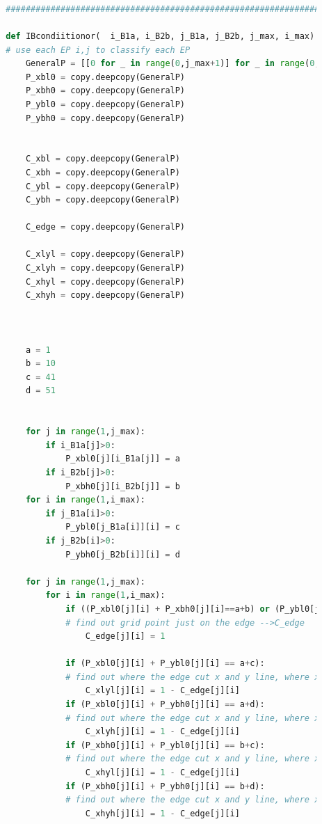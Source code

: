 \documentclass[12pt]{article}
\begin{document}
\begin{scriptsize}
\begin{lstlisting}[language=python,caption={Python code-Potential Flow}]
        
        
        
        ##########################################################################################
        
        def IBcondiitionor(  i_B1a, i_B2b, j_B1a, j_B2b, j_max, i_max): 
        # use each EP i,j to classify each EP
            GeneralP = [[0 for _ in range(0,j_max+1)] for _ in range(0,i_max+1)]
            P_xbl0 = copy.deepcopy(GeneralP)
            P_xbh0 = copy.deepcopy(GeneralP)
            P_ybl0 = copy.deepcopy(GeneralP)
            P_ybh0 = copy.deepcopy(GeneralP)
        
        
            C_xbl = copy.deepcopy(GeneralP)
            C_xbh = copy.deepcopy(GeneralP)
            C_ybl = copy.deepcopy(GeneralP)
            C_ybh = copy.deepcopy(GeneralP)
        
            C_edge = copy.deepcopy(GeneralP)
        
            C_xlyl = copy.deepcopy(GeneralP)
            C_xlyh = copy.deepcopy(GeneralP)
            C_xhyl = copy.deepcopy(GeneralP)
            C_xhyh = copy.deepcopy(GeneralP)
        
            
        
            a = 1
            b = 10
            c = 41
            d = 51
        
        
            for j in range(1,j_max):
                if i_B1a[j]>0:
                    P_xbl0[j][i_B1a[j]] = a
                if i_B2b[j]>0:
                    P_xbh0[j][i_B2b[j]] = b
            for i in range(1,i_max):
                if j_B1a[i]>0:
                    P_ybl0[j_B1a[i]][i] = c
                if j_B2b[i]>0:
                    P_ybh0[j_B2b[i]][i] = d
        
            for j in range(1,j_max):
                for i in range(1,i_max):
                    if ((P_xbl0[j][i] + P_xbh0[j][i]==a+b) or (P_ybl0[j][i] + P_ybh0[j][i]==c+d)): 
                    # find out grid point just on the edge -->C_edge
                        C_edge[j][i] = 1  
        
                    if (P_xbl0[j][i] + P_ybl0[j][i] == a+c):     
                    # find out where the edge cut x and y line, where x low y low -->C_xlyl
                        C_xlyl[j][i] = 1 - C_edge[j][i]
                    if (P_xbl0[j][i] + P_ybh0[j][i] == a+d):   
                    # find out where the edge cut x and y line, where x low y high -->C_xlyh
                        C_xlyh[j][i] = 1 - C_edge[j][i]
                    if (P_xbh0[j][i] + P_ybl0[j][i] == b+c):   
                    # find out where the edge cut x and y line, where x high y low -->C_xhyl
                        C_xhyl[j][i] = 1 - C_edge[j][i]
                    if (P_xbh0[j][i] + P_ybh0[j][i] == b+d):   
                    # find out where the edge cut x and y line, where x high y high -->C_xhyh
                        C_xhyh[j][i] = 1 - C_edge[j][i]
                    

\end{lstlisting}
\end{scriptsize}
\end{document}
